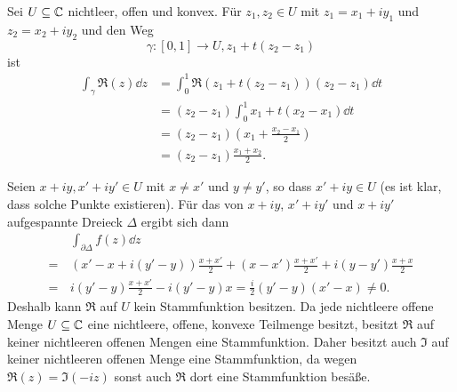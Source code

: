 \documentclass[a4paper,10pt]{article}
\begin{document}
Sei $U \subseteq \mathbb{C}$ nichtleer, offen und konvex. Für $z_1, z_2 \in U$ mit $z_1 = x_1 + iy_1$ und $z_2 = x_2 + iy_2$ und den Weg
\[
 \gamma : [0,1] \to U, z_1 + t(z_2 - z_1)
\]
ist
\begin{align*}
 \int_\gamma \Re(z) \dd{z}
 &= \int_0^1 \Re(z_1 + t(z_2 - z_1)) (z_2 - z_1) \dd{t} \\
 &= (z_2 - z_1) \int_0^1 x_1 + t(x_2 - x_1) \dd{t} \\
 &= (z_2 - z_1) \left( x_1 + \frac{x_2 - x_1}{2} \right) \\
 &= (z_2 - z_1) \frac{x_1 + x_2}{2}.
\end{align*}

Seien $x+iy, x'+iy' \in U$ mit $x \neq x'$ und $y \neq y'$, so dass $x'+iy \in U$ (es ist klar, dass solche Punkte existieren). Für das von $x+iy$, $x'+iy'$ und $x+iy'$ aufgespannte Dreieck $\Delta$ ergibt sich dann
\begin{align*}
  &\, \int_{\partial \Delta} f(z) \dd{z} \\
 =&\, (x'-x+i(y'-y))\frac{x+x'}{2} + (x-x')\frac{x+x'}{2} + i(y-y')\frac{x+x}{2} \\
 =&\, i(y'-y) \frac{x+x'}{2} - i(y'-y)x
 = \frac{i}{2}(y'-y)(x'-x)
 \neq 0.
\end{align*}
Deshalb kann $\Re$ auf $U$ kein Stammfunktion besitzen. Da jede nichtleere offene Menge $U \subseteq \mathbb{C}$ eine nichtleere, offene, konvexe Teilmenge besitzt, besitzt $\Re$ auf keiner nichtleeren offenen Mengen eine Stammfunktion. Daher besitzt auch $\Im$ auf keiner nichtleeren offenen Menge eine Stammfunktion, da wegen $\Re(z) = \Im(-iz)$ sonst auch $\Re$ dort eine Stammfunktion besäße.
\end{document}
